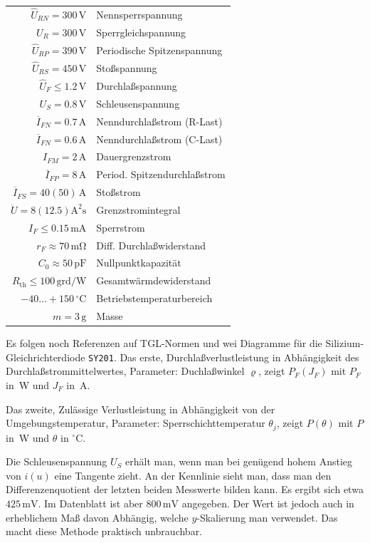 \documentclass[a4paper,10pt,fleqn,twocolumn,twoside]{article}
\numberwithin{equation}{section}
\begin{document}
\begin{tabular}{r|l}
$\hat U_{RN} = 300\,\mathrm{V}$ & Nennsperrspannung\\
$U_R = 300\,\mathrm{V}$ & Sperrgleichspannung\\
$\hat U_{RP} = 390\,\mathrm{V}$ & Periodische Spitzenspannung\\
$\hat U_{RS} = 450\,\mathrm{V}$ & Stoßspannung\\
\hline
$\hat U_F \le 1.2\,\mathrm{V}$ & Durchlaßspannung\\
$U_S = 0.8\,\mathrm{V}$ & Schleusenspannung\\
$\overline I_{FN} = 0.7\,\mathrm{A}$
  & Nenndurchlaßstrom (R-Last)\\
$\overline I_{FN} = 0.6\,\mathrm{A}$
  & Nenndurchlaßstrom (C-Last)\\
\hline
$I_{FM} = 2\,\mathrm{A}$ & Dauergrenzstrom\\
$\overline I_{FP}=8\,\mathrm{A}$
  & Period. Spitzendurchlaßstrom\\
$\overline I_{FS}=40(50)\,\mathrm{A}$
  & Stoßstrom\\
$\ddot U = 8(12.5)\mathrm{A^2 s}$
  & Grenzstromintegral\\
\hline
$I_F \le 0.15\,\mathrm{mA}$ & Sperrstrom\\
$r_F \approx 70\,\mathrm{m\Omega}$
  & Diff. Durchlaßwiderstand\\
$C_0 \approx 50\,\mathrm{pF}$
  & Nullpunktkapazität\\
$R_{\mathrm{th}}{\le}100\,\mathrm{grd/W}$
  & Gesamtwärmdewiderstand\\
\hline
$-40{\ldots}{+}150\,\mathrm{{}^\circ C}$
  & Betriebstemperaturbereich\\
$m=3\,\mathrm{g}$ & Masse
\end{tabular}
Es folgen noch Referenzen auf TGL-Normen und
wei Diagramme für die Silizium-Gleichrichterdiode \texttt{SY201}.
Das erste, {\glqq}Durchlaßverlustleistung in Abhängigkeit des
Durchlaßstrommittelwertes, Parameter: Duchlaßwinkel
$\varrho${\grqq}, zeigt  $P_F(J_F)$ mit $P_F$ in~W und $J_F$ in~A.

Das zweite, {\glqq}Zulässige Verlustleistung
in Abhängigkeit von der Umgebungstemperatur, Parameter:
Sperrschichttemperatur $\theta_j${\grqq}, zeigt $P(\theta)$
mit $P$ in~W und $\theta$ in ${}^\circ\mathrm{C}$.

Die Schleusenspannung $U_S$ erhält man,
wenn man bei genügend hohem Anstieg von $i(u)$ eine Tangente
zieht. An der Kennlinie sieht man, dass man den Differenzenquotient
der letzten beiden Messwerte bilden kann. Es ergibt sich etwa
$425\,\mathrm{mV}$. Im Datenblatt ist aber $800\,\mathrm{mV}$
angegeben. Der Wert ist jedoch auch in erheblichem
Maß davon Abhängig, welche $y$-Skalierung man verwendet.
Das macht diese Methode praktisch unbrauchbar.
\end{document}
